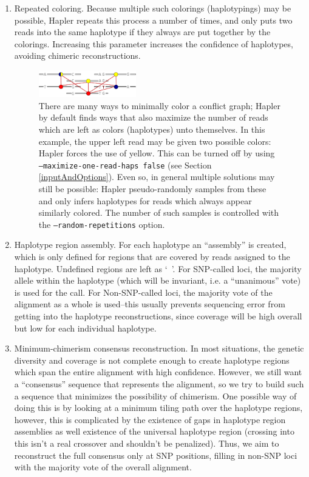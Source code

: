 \documentclass[11pt]{llncs}
\begin{document}
\begin{enumerate}
	\item Repeated coloring. Because multiple such colorings (haplotypings) may be possible, Hapler repeats this process a number of 
	times, and only puts two reads into the same haplotype if they always are put together by the colorings. Increasing this parameter increases the
	confidence of haplotypes, avoiding chimeric reconstructions.
	
\begin{figure}[!h]
\centering
   \includegraphics[width=0.4\textwidth]{graphics/two_haps_bicolor}
   \caption{There are many ways to minimally color a conflict graph; Hapler by default finds ways that also maximize the number of reads which 
   are left as colors (haplotypes) unto themselves. In this example, the upper left read may be given two possible colors: Hapler forces the use of
   yellow. This can be turned off by using \texttt{--maximize-one-read-haps false} (see Section \ref{inputAndOptions}). 
   Even so, in general multiple solutions may still be possible: Hapler pseudo-randomly samples from these and only infers haplotypes
   for reads which always appear similarly colored. The number of such samples is controlled with the \texttt{--random-repetitions} option.}
   \label{alternatecoloring}
\end{figure}

	
	\item Haplotype region assembly. For each haplotype an ``assembly'' is created, which is only defined for regions that are covered by reads assigned 
	to the
	haplotype. Undefined regions are left as `~'. For SNP-called loci, the majority allele within the haplotype (which will be invariant, i.e. a 
``unanimous'' vote) is used for the call. For Non-SNP-called loci, the majority
	vote of the alignment as a whole is used--this usually prevents sequencing error from getting into the haplotype reconstructions, since coverage 
	will be high overall but low for each individual haplotype.
	
	
	\item Minimum-chimerism consensus reconstruction. In most situations, the genetic diversity and coverage is not complete enough to create 
	haplotype regions which span the entire alignment with high confidence. However, we still want a ``consensus'' sequence that represents the 
	alignment, so we try to build such a sequence that minimizes the possibility of chimerism. One possible way of doing this is by looking at a 
	minimum tiling path over the haplotype regions, however, this is complicated by the existence of gaps in haplotype region assemblies as well 
	existence of the universal haplotype region (crossing into this isn't a real crossover and shouldn't be penalized). Thus, we aim to reconstruct 
	the full consensus only at SNP positions, filling in non-SNP loci with the majority vote of the overall alignment.\\
	

\end{enumerate}
\end{document}
